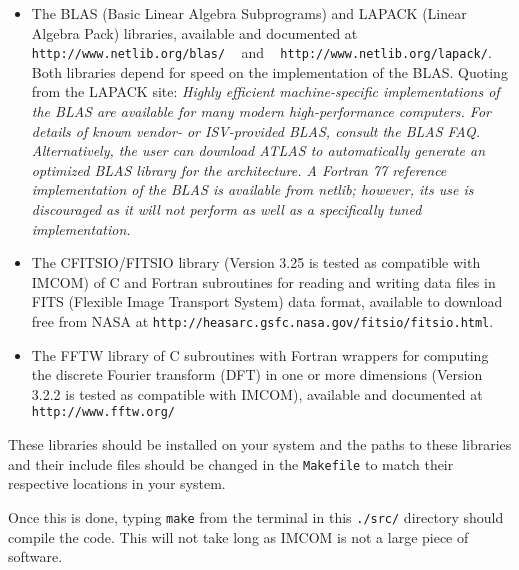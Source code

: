 \documentclass[10pt]{article}
\begin{document}
\begin{itemize}
\item The BLAS (Basic Linear Algebra Subprograms) and LAPACK (Linear Algebra Pack) libraries, available and documented at 
\newline
\texttt{http://www.netlib.org/blas/} ~ and ~ \newline
 \texttt{http://www.netlib.org/lapack/}.  
\newline
Both libraries depend for speed on the implementation of the BLAS.  Quoting from the LAPACK site: \emph{Highly efficient machine-specific implementations of the BLAS are available for many modern high-performance computers. For details of known vendor- or ISV-provided BLAS, consult the BLAS FAQ. Alternatively, the user can download ATLAS to automatically generate an optimized BLAS library for the architecture. A Fortran 77 reference implementation of the BLAS is available from netlib; however, its use is discouraged as it will not perform as well as a specifically tuned implementation.}

\item The CFITSIO/FITSIO library (Version 3.25 is tested as compatible with IMCOM) of C and Fortran subroutines for reading and writing data files in FITS (Flexible Image Transport System) data format, available to download free from NASA at \newline \texttt{http://heasarc.gsfc.nasa.gov/fitsio/fitsio.html}.

\item The FFTW library of C subroutines with Fortran wrappers for computing the discrete Fourier transform (DFT) in one or more dimensions (Version 3.2.2 is tested as compatible with IMCOM), available and documented at \newline
\texttt{http://www.fftw.org/}
\end{itemize}

These libraries should be installed on your system and the paths to these libraries and their include files should be changed in the \texttt{Makefile} to match their respective locations in your system.  

Once this is done, typing \texttt{make} from the terminal in this \texttt{./src/} directory should compile the code.  This will not take long as IMCOM is not a large piece of software.
\end{document}

